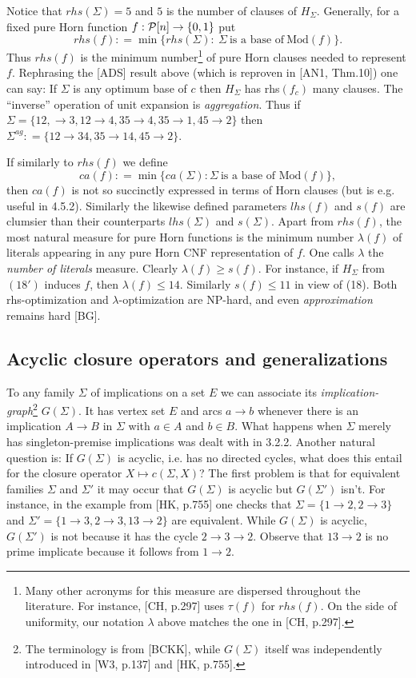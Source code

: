 \documentclass[11pt]{article}
\newcommand{\ra}{\rightarrow}
\begin{document}
Notice that $rhs (\Sigma) = 5$ and $5$ is the number of clauses of $H_\Sigma$. Generally, for a fixed pure Horn function $f: {\cal P}[n] \ra \{0,1\}$ put
$$rhs(f) : = \min \{rhs(\Sigma) : \ \Sigma \ \mbox{is a base of} \ \mbox{Mod}(f)\}.$$
Thus $rhs(f)$ is the minimum number\footnote{Many other acronyms for this measure are dispersed throughout the literature. For instance, [CH, p.297] uses $\tau (f)$ for $rhs(f)$. On the side of uniformity, our notation $\lambda$ above matches the one in [CH, p.297].}
of pure Horn clauses needed to represent $f$. Rephrasing the [ADS] result above (which is reproven in [AN1, Thm.10]) one can say: If $\Sigma$ is any optimum base of $c$ then $H_\Sigma$ has rhs$(f_c)$ many clauses. The ``inverse'' operation of unit expansion is {\it aggregation}. Thus if $\Sigma = \{12, \ra 3, 12 \ra 4, 35 \ra 4, 35 \ra 1, 45 \ra 2\}$ then $\Sigma^{ag}: = \{12 \ra 34, 35 \ra 14, 45 \ra 2\}$. 

If similarly to $rhs(f)$ we define
$$ca(f) : = \min \{ca (\Sigma ) : \Sigma \ \mbox{is a base of Mod}(f)\},$$
then $ca(f)$ is not so succinctly expressed in terms of Horn clauses (but is e.g. useful in 4.5.2). Similarly the likewise defined parameters $lhs(f)$ and $s(f)$ are clumsier than their counterparts $lhs(\Sigma)$ and $s(\Sigma)$. Apart from   $rhs(f)$, the most natural measure for pure Horn functions is the minimum number $\lambda(f)$ of literals appearing in any pure Horn CNF representation of $f$. One calls $\lambda$ the {\it number of literals} measure. Clearly $\lambda (f) \geq s(f)$. For instance, if $H_\Sigma$ from $(18')$ induces $f$, then $\lambda (f) \leq 14$. Similarly $s(f) \leq 11$ in view of (18).
Both rhs-optimization and $\lambda$-optimization are NP-hard, and even {\it approximation} remains hard [BG].




\subsection{Acyclic closure operators and generalizations}

To any family $\Sigma$ of implications on a set $E$ we can associate its {\it implication-graph}\footnote{The terminology is from [BCKK], while $G(\Sigma)$ itself was independently introduced in [W3, p.137] and [HK, p.755].} $G(\Sigma)$. It has vertex set $E$ and arcs $a \ra b$ whenever there is an implication $A \ra B$ in $\Sigma$ with $a \in A$ and $b \in B$. What happens when $\Sigma$ merely has singleton-premise implications was dealt with in 3.2.2. Another natural question is: If $G(\Sigma)$ is acyclic, i.e. has no directed cycles, what does this entail for the closure operator  $X \mapsto c(\Sigma, X)$?
The first problem is that for equivalent families $\Sigma$ and $\Sigma'$ it may occur that $G(\Sigma)$ is acyclic but $G(\Sigma')$ isn't. For instance, in the example from [HK, p.755] one checks that $\Sigma = \{1 \ra 2, 2 \ra 3\}$ and $\Sigma'= \{1 \ra 3, 2 \ra 3, 13 \ra 2 \}$ are equivalent. While $G(\Sigma)$ is acyclic, $G(\Sigma')$ is not because it has the cycle $2 \ra 3 \ra 2$. Observe that $13 \ra 2$ is no prime implicate because
it follows from $1 \ra 2$. 
\end{document}
